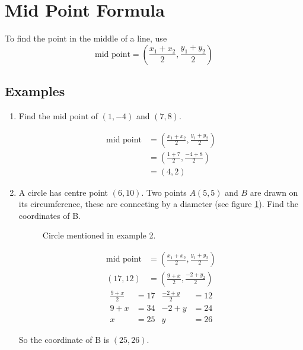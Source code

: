 \section{Mid Point Formula}
To find the point in the middle of a line, use
\begin{equation}
\text{mid point} = \left(\frac{x_1 + x_2}{2},\frac{y_1 + y_2}{2}\right)
\end{equation}

\subsection{Examples}
\begin{enumerate}
	\item
	Find the mid point of $\left(1,-4\right)$ and $\left(7,8\right)$.
	
	\begin{align*}
		\text{mid point} &= \left(\frac{x_1 + x_2}{2},\frac{y_1 + y_2}{2}\right)\\
		&= \left(\frac{1 + 7}{2},\frac{-4 + 8}{2}\right)\\
		&= \left(4,2\right)
	\end{align*}
	
	\item
	A circle has centre point $(6,10)$. Two points $A(5,5)$ and $B$ are drawn on its circumference, these are connecting by a diameter (see figure \ref{fig:MidPointQ2}). Find the coordinates of B.
	\begin{figure}[h!]
		\centering
		\caption{Circle mentioned in example 2.}
		\label{fig:MidPointQ2}
	\end{figure}
	\begin{align*}
		\text{mid point} &= \left(\frac{x_1 + x_2}{2},\frac{y_1 + y_2}{2}\right)\\
		\left(17, 12\right) &= \left(\frac{9+x}{2},\frac{-2 + y_2}{2}\right)
	\end{align*}
	\begin{align*}
		\frac{9+x}{2} &= 17 & \frac{-2+y}{2} &= 12\\
		9+x &= 34 & -2+y &= 24\\
		x &= 25 & y &= 26
	\end{align*}
	
	So the coordinate of B is $\left(25,26\right)$.
\end{enumerate}


